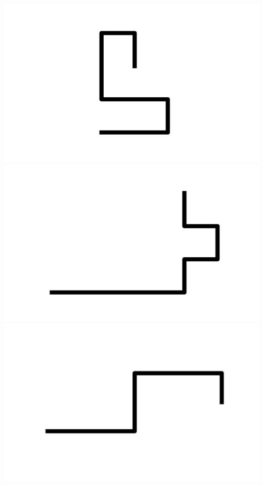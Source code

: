 \documentclass[]{report}
\begin{document}
\includegraphics[scale=.1]{pictures/21/state_cluster_shapes_409.pdf} 
\includegraphics[scale=.1]{pictures/21/state_cluster_shapes_410.pdf} 
\includegraphics[scale=.1]{pictures/21/state_cluster_shapes_411.pdf} 
\end{document}
